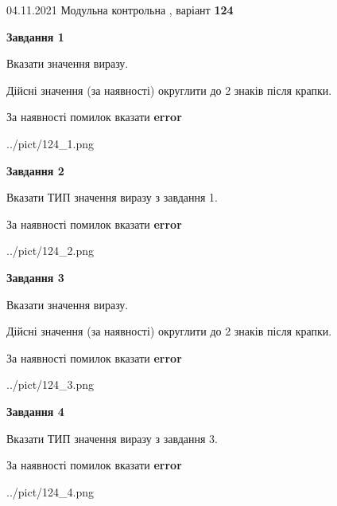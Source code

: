 \documentclass[11pt, ukrainian]{article}
\begin{document}
{04.11.2021 Модульна контрольна , варіант  \No \textbf { 124 }\par}
{
\begin {large}
{\begin {center}\textbf{Завдання 1}\end {center}}\par
Вказати значення виразу. \par
Дійсні значення (за наявності) округлити до 2 знаків після крапки. \par
За наявності помилок вказати \textbf{error}

\begin{center}
	{../pict/124_1.png}
\end{center}
\newpage

{\begin {center}\textbf{Завдання 2}\end {center}}\par
Вказати ТИП значення виразу з завдання 1. \par
За наявності помилок вказати \textbf{error}

\begin{center}
	{../pict/124_2.png}
\end{center}
\newpage

{\begin {center}\textbf{Завдання 3}\end {center}}\par
Вказати значення виразу. \par
Дійсні значення (за наявності) округлити до 2 знаків після крапки. \par
За наявності помилок вказати \textbf{error}

\begin{center}
	{../pict/124_3.png}
\end{center}
\newpage

{\begin {center}\textbf{Завдання 4}\end {center}}\par
Вказати ТИП значення виразу з завдання 3. \par
За наявності помилок вказати \textbf{error}

\begin{center}
	{../pict/124_4.png}
\end{center}
\newpage


\end{large}}
\end{document}
